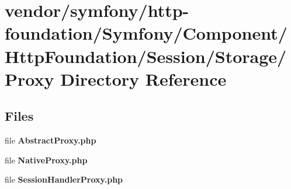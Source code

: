 \section{vendor/symfony/http-\/foundation/\+Symfony/\+Component/\+Http\+Foundation/\+Session/\+Storage/\+Proxy Directory Reference}
\label{dir_0e66937d2c4a2bb6df30467ca62b77a5}
\subsection*{Files}
\begin{DoxyCompactItemize}
\item 
file {\bf Abstract\+Proxy.\+php}
\item 
file {\bf Native\+Proxy.\+php}
\item 
file {\bf Session\+Handler\+Proxy.\+php}
\end{DoxyCompactItemize}
